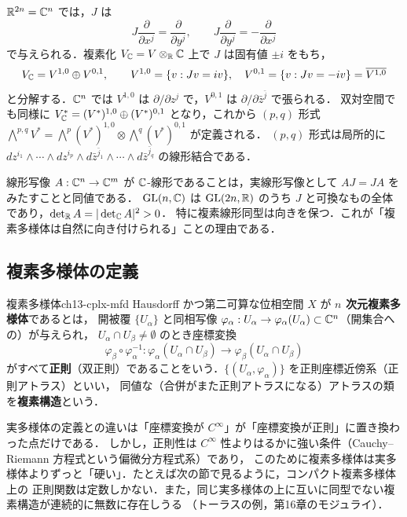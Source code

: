 $\mathbb{R}^{2n}=\mathbb{C}^n$ では，$J$ は
\begin{equation}
  J\frac{\partial}{\partial x^j}=\frac{\partial}{\partial y^j},\qquad J\frac{\partial}{\partial y^j}=-\frac{\partial}{\partial x^j}
\end{equation}
で与えられる．複素化 $V_{\mathbb{C}}=V\otimes_{\mathbb{R}}\mathbb{C}$ 上で $J$ は固有値 $\pm i$ をもち，
\begin{equation}
  V_{\mathbb{C}} = V^{1,0}\oplus V^{0,1},\qquad V^{1,0}=\{v: Jv = iv\},\quad V^{0,1}=\{v:Jv=-iv\}=\overline{V^{1,0}}
\end{equation}
と分解する．$\mathbb{C}^n$ では $V^{1,0}$ は $\partial/\partial z^j$ で，$V^{0,1}$ は $\partial/\partial\bar z^{\bar j}$ で張られる．
双対空間でも同様に $V_{\mathbb{C}}^*=(V^*)^{1,0}\oplus(V^*)^{0,1}$ となり，これから
$(p,q)$ 形式 $\bigwedge^{p,q}V^* = \bigwedge^p (V^*)^{1,0}\otimes\bigwedge^q (V^*)^{0,1}$ が定義される．
$(p,q)$ 形式は局所的に $dz^{i_1}\wedge\cdots\wedge dz^{i_p}\wedge d\bar z^{\bar j_1}\wedge\cdots\wedge d\bar z^{\bar j_q}$ の線形結合である．

\begin{note}
線形写像 $A:\mathbb{C}^n\to\mathbb{C}^m$ が $\mathbb{C}$-線形であることは，実線形写像として $AJ = JA$ をみたすことと同値である．
$\operatorname{GL}(n,\mathbb{C})$ は $\operatorname{GL}(2n,\mathbb{R})$ のうち $J$ と可換なもの全体であり，$\det_{\mathbb{R}} A = |\det_{\mathbb{C}} A|^2>0$．
特に複素線形同型は向きを保つ．これが「複素多様体は自然に向き付けられる」ことの理由である．
\end{note}

\subsection{複素多様体の定義}

\begin{mydef}{複素多様体}{ch13-cplx-mfd}
Hausdorff かつ第二可算な位相空間 $X$ が \textbf{$n$ 次元複素多様体}であるとは，
開被覆 $\{U_\alpha\}$ と同相写像 $\varphi_\alpha:U_\alpha\to\varphi_\alpha(U_\alpha)\subset\mathbb{C}^n$（開集合への）が与えられ，
$U_\alpha\cap U_\beta\neq\emptyset$ のとき座標変換
\begin{equation}
  \varphi_\beta\circ\varphi_\alpha^{-1}:\varphi_\alpha(U_\alpha\cap U_\beta)\to\varphi_\beta(U_\alpha\cap U_\beta)
\end{equation}
がすべて\textbf{正則}（双正則）であることをいう．$\{(U_\alpha,\varphi_\alpha)\}$ を正則座標近傍系（正則アトラス）といい，
同値な（合併がまた正則アトラスになる）アトラスの類を\textbf{複素構造}という．
\end{mydef}

実多様体の定義との違いは「座標変換が $C^\infty$」が「座標変換が正則」に置き換わった点だけである．
しかし，正則性は $C^\infty$ 性よりはるかに強い条件（Cauchy--Riemann 方程式という偏微分方程式系）であり，
このために複素多様体は実多様体よりずっと「硬い」．たとえば次の節で見るように，コンパクト複素多様体上の
正則関数は定数しかない．また，同じ実多様体の上に互いに同型でない複素構造が連続的に無数に存在しうる
（トーラスの例，第16章のモジュライ）．

